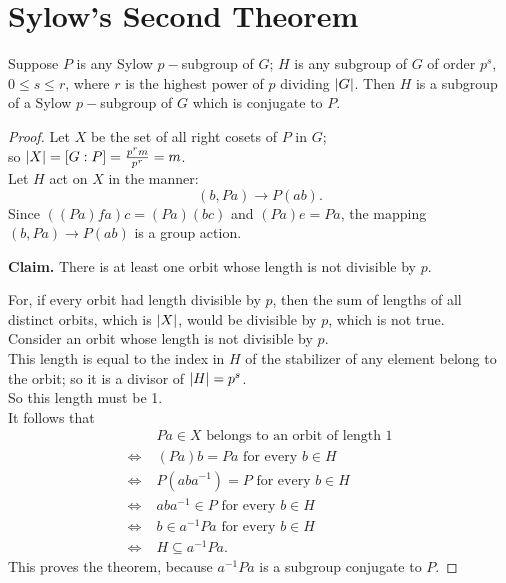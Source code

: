 \documentclass[../main-sheet.tex]{subfiles}
\begin{document}
\section{Sylow's Second Theorem}
\begin{thm}
    Suppose \(P\) is any Sylow \(p-\)subgroup of \(G\); \(H\) is any subgroup of \(G\) of order \(p^s\), \(0\leq s\leq r\), where \(r\) is the highest power of \(p\) dividing \(\left\vert G\right\vert\). Then \(H\) is a subgroup of a Sylow \(p-\)subgroup of \(G\) which is conjugate to \(P\).
\end{thm}
\begin{proof}
    Let \(X\) be the set of all right cosets of \(P\) in \(G \);\\
    so \(\left\vert X\right\vert = [G: P] = \frac{p^r m}{p^r}= m\).\\
    Let \(H\) act on \(X\) in the manner:
    \[(b, Pa) \to P(ab).\]
    Since \(((Pa)fa)c = (Pa)(bc)\) and \((Pa)e = Pa\),
    the mapping \((b, Pa) \to P(ab)\) is a group action.


    \textbf{Claim.} There is at least one orbit whose length is not divisible by \(p\).


    For, if every orbit had length divisible by \(p\), then the sum of lengths of all distinct
    orbits, which is \(\left\vert X\right\vert\), would be divisible by \(p\), which is not true.\\
        Consider an orbit whose length is not divisible by \(p\).\\
        This length is equal to the index in \(H\) of the stabilizer of any element belong to the
        orbit; so it is a divisor of \(\left\vert H\right\vert = p^s\).\\
        So this length must be 1.\\
        It follows that
        \begin{align*}
            & Pa \in X \text{ belongs to an orbit of length } 1\\
            \Leftrightarrow\;& (Pa) b = Pa \text{ for every }b\in H\\
            \Leftrightarrow\;& P(aba^{-1}) = P \text{ for every } b\in H\\
            \Leftrightarrow\;& aba^{-1} \in P \text{ for every } b \in H\\
            \Leftrightarrow\;& b \in a^{-1}Pa \text{ for every } b \in H\\
            \Leftrightarrow\;& H\subseteq a^{-1} Pa.
        \end{align*}
        This proves the theorem, because \(a^{-1} Pa\) is
        a subgroup conjugate to \(P\).
\end{proof}
\end{document}
